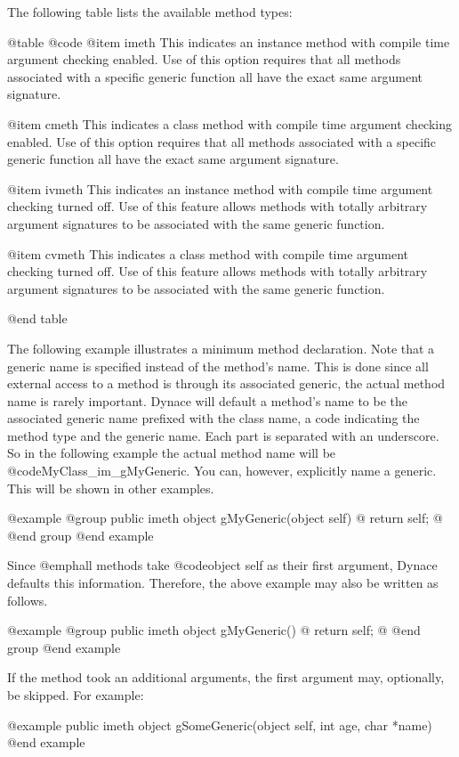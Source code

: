 The following table lists the available method types:

@table @code
@item imeth
This indicates an instance method with compile time argument checking
enabled.  Use of this option requires that all methods associated
with a specific generic function all have the exact same argument
signature.

@item cmeth
This indicates a class method with compile time argument checking
enabled.  Use of this option requires that all methods associated with a
specific generic function all have the exact same argument signature.

@item ivmeth
This indicates an instance method with compile time argument checking
turned off.  Use of this feature allows methods with totally arbitrary
argument signatures to be associated with the same generic function.

@item cvmeth
This indicates a class method with compile time argument checking
turned off.  Use of this feature allows methods with totally arbitrary
argument signatures to be associated with the same generic function.


@end table

The following example illustrates a minimum method declaration.  Note
that a generic name is specified instead of the method's name.  This is
done since all external access to a method is through its associated
generic, the actual method name is rarely important.  Dynace will
default a method's name to be the associated generic name prefixed with
the class name, a code indicating the method type and the generic name.
Each part is separated with an underscore.  So in the following example
the actual method name will be @code{MyClass_im_gMyGeneric}.  You can,
however, explicitly name a generic.  This will be shown in other
examples.

@example
@group
public  imeth   object  gMyGeneric(object self)
@{
        return self;
@}
@end group
@end example


Since @emph{all} methods take @code{object self} as their first argument,
Dynace defaults this information.  Therefore, the above example may also
be written as follows.  


@example
@group
public  imeth   object  gMyGeneric()
@{
        return self;
@}
@end group
@end example


If the method took an additional arguments, the first argument may,
optionally, be skipped.  For example:

@example
public  imeth   object  gSomeGeneric(object self, int age, char *name)
@end example

